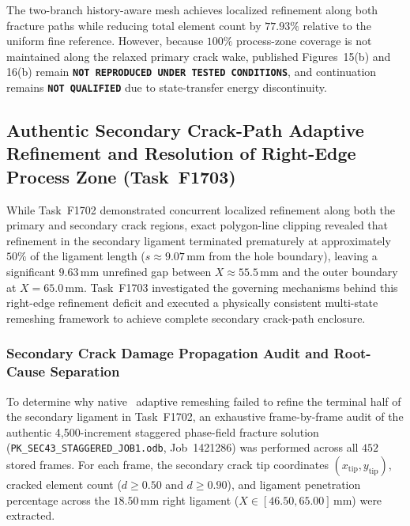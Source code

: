 The two-branch history-aware mesh achieves localized refinement along both fracture paths while reducing total element count by $77.93\%$ relative to the uniform fine reference. However, because $100\%$ process-zone coverage is not maintained along the relaxed primary crack wake, published Figures~15(b) and 16(b) remain \textbf{\texttt{NOT REPRODUCED UNDER TESTED CONDITIONS}}, and continuation remains \textbf{\texttt{NOT QUALIFIED}} due to state-transfer energy discontinuity.

\subsection{Authentic Secondary Crack-Path Adaptive Refinement and Resolution of Right-Edge Process Zone (Task~F1703)}
\label{subsec:f1703_sec43_secondary_refinement}

While Task~F1702 demonstrated concurrent localized refinement along both the primary and secondary crack regions, exact polygon-line clipping revealed that refinement in the secondary ligament terminated prematurely at approximately $50\%$ of the ligament length ($s \approx 9.07\,\mathrm{mm}$ from the hole boundary), leaving a significant $9.63\,\mathrm{mm}$ unrefined gap between $X \approx 55.5\,\mathrm{mm}$ and the outer boundary at $X = 65.0\,\mathrm{mm}$. Task~F1703 investigated the governing mechanisms behind this right-edge refinement deficit and executed a physically consistent multi-state remeshing framework to achieve complete secondary crack-path enclosure.

\subsubsection{Secondary Crack Damage Propagation Audit and Root-Cause Separation}
To determine why native \MISESERI\ adaptive remeshing failed to refine the terminal half of the secondary ligament in Task~F1702, an exhaustive frame-by-frame audit of the authentic 4,500-increment staggered phase-field fracture solution (\texttt{PK\_SEC43\_STAGGERED\_JOB1.odb}, Job~1421286) was performed across all $452$ stored frames. For each frame, the secondary crack tip coordinates $(x_{\mathrm{tip}}, y_{\mathrm{tip}})$, cracked element count ($d \ge 0.50$ and $d \ge 0.90$), and ligament penetration percentage across the $18.50\,\mathrm{mm}$ right ligament ($X \in [46.50, 65.00]\,\mathrm{mm}$) were extracted.

